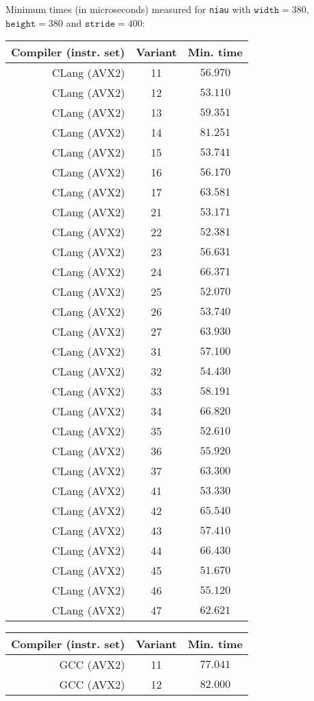 \documentclass[10pt]{article}
\begin{document}
Minimum times (in microseconds) measured for \verb+niau+ with
$\mathtt{width} = 380$, $\mathtt{height} = 380$ and $\mathtt{stride} =
400$:

\newcommand{\CLANG}[6]{CLang (AVX2) & #1 & $#2$ \\}
\newcommand{\GNUCC}[6]{GCC (AVX2) & #1 & $#2$ \\}

{\small
\begin{tabular}{rcc}
  \hline
  Compiler (instr. set) & Variant & Min. time \\
  \hline
  \hline
  \CLANG{11}{56.970}{ 74.530}{ 58.058186}{ 1.605700}{µs}
  \CLANG{12}{53.110}{ 81.671}{ 54.620167}{ 1.720122}{µs}
  \CLANG{13}{59.351}{140.521}{ 61.005435}{ 3.051151}{µs}
  \CLANG{14}{81.251}{178.312}{ 85.348006}{10.007648}{µs}
  \CLANG{15}{53.741}{ 87.721}{ 55.202642}{ 2.355055}{µs}
  \CLANG{16}{56.170}{ 96.170}{ 57.526538}{ 2.233562}{µs}
  \CLANG{17}{63.581}{105.000}{ 64.952477}{ 2.190579}{µs}
  \hline
  \CLANG{21}{53.171}{ 87.361}{ 54.481988}{ 2.307893}{µs}
  \CLANG{22}{52.381}{ 92.280}{ 54.173267}{ 2.169050}{µs}
  \CLANG{23}{56.631}{ 97.441}{ 58.096858}{ 2.050985}{µs}
  \CLANG{24}{66.371}{145.831}{ 68.360545}{ 4.243564}{µs}
  \CLANG{25}{52.070}{283.432}{ 57.394765}{ 9.062245}{µs}
  \CLANG{26}{53.740}{ 88.871}{ 55.447496}{ 1.946086}{µs}
  \CLANG{27}{63.930}{100.861}{ 65.434994}{ 2.572050}{µs}
  \hline
  \CLANG{31}{57.100}{ 89.121}{ 58.416060}{ 1.986981}{µs}
  \CLANG{32}{54.430}{ 72.571}{ 56.579088}{ 1.769608}{µs}
  \CLANG{33}{58.191}{169.201}{ 60.013186}{ 3.250281}{µs}
  \CLANG{34}{66.820}{ 92.631}{ 68.123130}{ 1.921881}{µs}
  \CLANG{35}{52.610}{ 86.950}{ 54.536280}{ 2.711644}{µs}
  \CLANG{36}{55.920}{ 92.291}{ 57.693083}{ 2.388796}{µs}
  \CLANG{37}{63.300}{182.862}{ 65.823999}{ 4.582080}{µs}
  \hline
  \CLANG{41}{53.330}{ 73.971}{ 55.054576}{ 1.705375}{µs}
  \CLANG{42}{65.540}{153.911}{ 69.425782}{ 9.363764}{µs}
  \CLANG{43}{57.410}{ 74.531}{ 58.776598}{ 1.568815}{µs}
  \CLANG{44}{66.430}{179.071}{ 76.198362}{13.123401}{µs}
  \CLANG{45}{51.670}{229.022}{ 60.313979}{10.400270}{µs}
  \CLANG{46}{55.120}{ 86.741}{ 56.904224}{ 1.945661}{µs}
  \CLANG{47}{62.621}{ 82.680}{ 64.097832}{ 1.729211}{µs}
  \hline
\end{tabular}
\begin{tabular}{rcc}
  \hline
  Compiler (instr. set) & Variant & Min. time \\
  \hline
  \hline
  \GNUCC{11}{  77.041}{ 226.231}{ 86.575946}{16.793423}{µs}
  \GNUCC{12}{  82.000}{ 155.871}{ 84.398167}{ 4.693786}{µs}

\end{tabular}}
\end{document}
